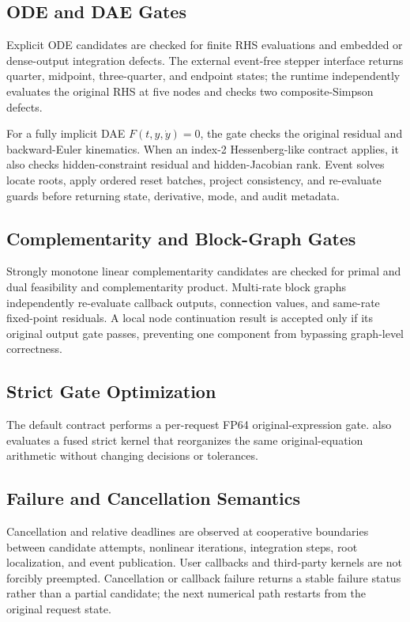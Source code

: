 \subsection{ODE and DAE Gates}

Explicit ODE candidates are checked for finite RHS evaluations and embedded or
dense-output integration defects. The external event-free stepper interface returns
quarter, midpoint, three-quarter, and endpoint states; the runtime independently
evaluates the original RHS at five nodes and checks two composite-Simpson defects.

For a fully implicit DAE $F(t,y,\dot y)=0$, the gate checks the original residual
and backward-Euler kinematics. When an index-2 Hessenberg-like contract applies, it
also checks hidden-constraint residual and hidden-Jacobian rank. Event solves locate
roots, apply ordered reset batches, project consistency, and re-evaluate guards before
returning state, derivative, mode, and audit metadata.

\subsection{Complementarity and Block-Graph Gates}

Strongly monotone linear complementarity candidates are checked for primal and
dual feasibility and complementarity product. Multi-rate block graphs independently
re-evaluate callback outputs, connection values, and same-rate fixed-point
residuals. A local node continuation result is accepted only if its original output gate
passes, preventing one component from bypassing graph-level correctness.

\subsection{Strict Gate Optimization}

The default contract performs a per-request FP64 original-expression gate. \system
also evaluates a fused strict kernel that reorganizes the same original-equation
arithmetic without changing decisions or tolerances.

\subsection{Failure and Cancellation Semantics}

Cancellation and relative deadlines are observed at cooperative boundaries between
candidate attempts, nonlinear iterations, integration steps, root localization,
and event publication. User callbacks and third-party kernels are not forcibly
preempted. Cancellation or callback failure returns a stable failure status rather
than a partial candidate; the next numerical path restarts from the original request state.

